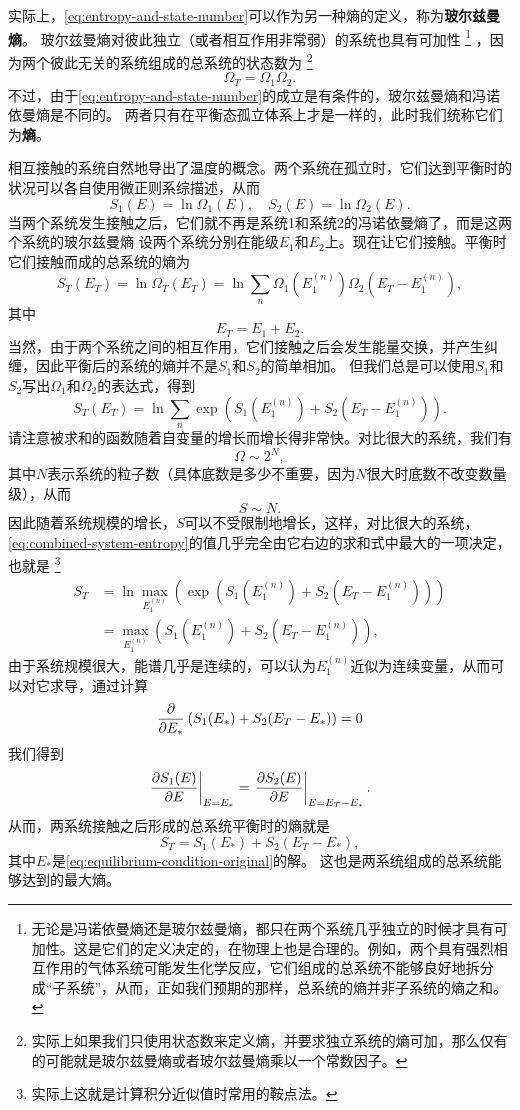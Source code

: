 \documentclass[hyperref, UTF8, a4paper]{ctexart}
\begin{document}
实际上，\eqref{eq:entropy-and-state-number}可以作为另一种熵的定义，称为\textbf{玻尔兹曼熵}。
玻尔兹曼熵对彼此独立（或者相互作用非常弱）的系统也具有可加性%
\footnote{无论是冯诺依曼熵还是玻尔兹曼熵，都只在两个系统几乎独立的时候才具有可加性。这是它们的定义决定的，在物理上也是合理的。例如，两个具有强烈相互作用的气体系统可能发生化学反应，它们组成的总系统不能够良好地拆分成“子系统”，从而，正如我们预期的那样，总系统的熵并非子系统的熵之和。}%
，因为两个彼此无关的系统组成的总系统的状态数为%
\footnote{实际上如果我们只使用状态数来定义熵，并要求独立系统的熵可加，那么仅有的可能就是玻尔兹曼熵或者玻尔兹曼熵乘以一个常数因子。}%
\begin{equation}
    \Omega_T = \Omega_1 \Omega_2.
\end{equation}
不过，由于\eqref{eq:entropy-and-state-number}的成立是有条件的，玻尔兹曼熵和冯诺依曼熵是不同的。
两者只有在平衡态孤立体系上才是一样的，此时我们统称它们为\textbf{熵}。

相互接触的系统自然地导出了温度的概念。两个系统在孤立时，它们达到平衡时的状况可以各自使用微正则系综描述，从而
\[
    S_1(E) = \ln \Omega_1 (E), \quad S_2 (E) = \ln \Omega_2 (E).
\]
当两个系统发生接触之后，它们就不再是系统1和系统2的冯诺依曼熵了，而是这两个系统的玻尔兹曼熵
设两个系统分别在能级$E_1$和$E_2$上。现在让它们接触。平衡时它们接触而成的总系统的熵为
\[
    S_T(E_T) = \ln \Omega_T (E_T) = \ln \sum_{n} \Omega_1 (E_1^{(n)}) \Omega_2 (E_T - E_1^{(n)}),
\]
其中
\[
    E_T = E_1 + E_2.
\]
当然，由于两个系统之间的相互作用，它们接触之后会发生能量交换，并产生纠缠，因此平衡后的系统的熵并不是$S_1$和$S_2$的简单相加。
但我们总是可以使用$S_1$和$S_2$写出$\Omega_1$和$\Omega_2$的表达式，得到
\begin{equation}
    S_T(E_T) = \ln \sum_{n} \exp \left(S_1(E_1^{(n)})+S_2(E_T-E_1^{(n)})\right).
    \label{eq:combined-system-entropy}
\end{equation}
请注意被求和的函数随着自变量的增长而增长得非常快。对比很大的系统，我们有
\[
    \Omega \sim 2^N,
\]
其中$N$表示系统的粒子数（具体底数是多少不重要，因为$N$很大时底数不改变数量级），从而
\[
    S \sim N.
\]
因此随着系统规模的增长，$S$可以不受限制地增长，这样，对比很大的系统，\eqref{eq:combined-system-entropy}的值几乎完全由它右边的求和式中最大的一项决定，也就是%
\footnote{实际上这就是计算积分近似值时常用的鞍点法。}
\[
    \begin{aligned}
        S_T &= \ln \max_{E_1^{(n)}} \left( \exp \left(S_1(E_1^{(n)})+S_2(E_T-E_1^{(n)})\right) \right) \\
        &= \max_{E_1^{(n)}} \left(S_1(E_1^{(n)})+S_2(E_T-E_1^{(n)})\right),
    \end{aligned}
\]
由于系统规模很大，能谱几乎是连续的，可以认为$E_1^{(n)}$近似为连续变量，从而可以对它求导，通过计算
\[
    \pdv{E_*} \left( S_1(E_*) + S_2(E_T-E_*) \right) = 0
\]
我们得到
\begin{equation}
    \eval{\pdv{S_1(E)}{E}}_{E=E_*} = \eval{\pdv{S_2(E)}{E}}_{E=E_T-E_*}.
    \label{eq:equilibrium-condition-original}
\end{equation}
从而，两系统接触之后形成的总系统平衡时的熵就是
\begin{equation}
    S_T = S_1(E_*) + S_2(E_T-E_*),
\end{equation}
其中$E_*$是\eqref{eq:equilibrium-condition-original}的解。
这也是两系统组成的总系统能够达到的最大熵。
\end{document}
